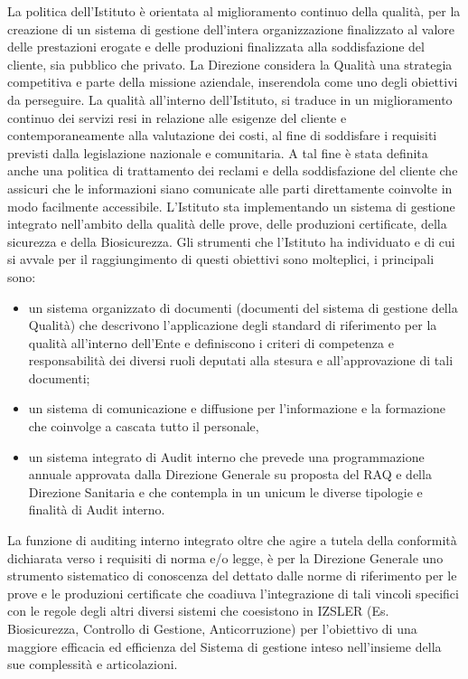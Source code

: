 \documentclass[
  12pt,
]{article}
\providecommand{\tightlist}{%
  \setlength{\itemsep}{0pt}\setlength{\parskip}{0pt}}
\begin{document}
La politica dell'Istituto è orientata al miglioramento continuo della
qualità, per la creazione di un sistema di gestione dell'intera
organizzazione finalizzato al valore delle prestazioni erogate e delle
produzioni finalizzata alla soddisfazione del cliente, sia pubblico che
privato. La Direzione considera la Qualità una strategia competitiva e
parte della missione aziendale, inserendola come uno degli obiettivi da
perseguire. La qualità all'interno dell'Istituto, si traduce in un
miglioramento continuo dei servizi resi in relazione alle esigenze del
cliente e contemporaneamente alla valutazione dei costi, al fine di
soddisfare i requisiti previsti dalla legislazione nazionale e
comunitaria. A tal fine è stata definita anche una politica di
trattamento dei reclami e della soddisfazione del cliente che assicuri
che le informazioni siano comunicate alle parti direttamente coinvolte
in modo facilmente accessibile. L'Istituto sta implementando un sistema
di gestione integrato nell'ambito della qualità delle prove, delle
produzioni certificate, della sicurezza e della Biosicurezza. Gli
strumenti che l'Istituto ha individuato e di cui si avvale per il
raggiungimento di questi obiettivi sono molteplici, i principali sono:

\begin{itemize}
\tightlist
\item
  un sistema organizzato di documenti (documenti del sistema di gestione
  della Qualità) che descrivono l'applicazione degli standard di
  riferimento per la qualità all'interno dell'Ente e definiscono i
  criteri di competenza e responsabilità dei diversi ruoli deputati alla
  stesura e all'approvazione di tali documenti;
\item
  un sistema di comunicazione e diffusione per l'informazione e la
  formazione che coinvolge a cascata tutto il personale,
\item
  un sistema integrato di Audit interno che prevede una programmazione
  annuale approvata dalla Direzione Generale su proposta del RAQ e della
  Direzione Sanitaria e che contempla in un unicum le diverse tipologie
  e finalità di Audit interno.
\end{itemize}

La funzione di auditing interno integrato oltre che agire a tutela della
conformità dichiarata verso i requisiti di norma e/o legge, è per la
Direzione Generale uno strumento sistematico di conoscenza del dettato
dalle norme di riferimento per le prove e le produzioni certificate che
coadiuva l'integrazione di tali vincoli specifici con le regole degli
altri diversi sistemi che coesistono in IZSLER (Es. Biosicurezza,
Controllo di Gestione, Anticorruzione) per l'obiettivo di una maggiore
efficacia ed efficienza del Sistema di gestione inteso nell'insieme
della sue complessità e articolazioni.
\end{document}
